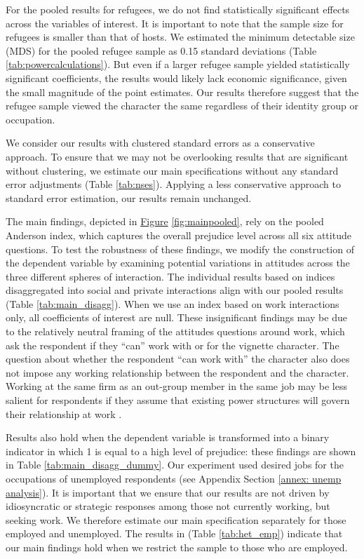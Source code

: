 \documentclass[a4paper,12pt]{article}
\begin{document}
For the pooled results for refugees, we do not find statistically significant effects across the variables of interest. It is important to note that the sample size for refugees is smaller than that of hosts. We estimated the minimum detectable size (MDS) for the pooled refugee sample as 0.15 standard deviations (Table \ref{tab:powercalculations}). But even if a larger refugee sample yielded statistically significant coefficients, the results would likely lack economic significance, given the small magnitude of the point estimates.  Our results therefore suggest that the refugee sample viewed the character the same regardless of their identity group or occupation.

We consider our results with clustered standard errors as a conservative approach. To ensure that we may not be overlooking results that are significant without clustering, we estimate our main specifications without any standard error adjustments (Table \ref{tab:nses}). Applying a less conservative approach to standard error estimation, our results remain unchanged.

The main findings, depicted in \hyperref[fig:mainpooled]{Figure} \ref{fig:mainpooled}, rely on the pooled Anderson index, which captures the overall prejudice level across all six attitude questions. To test the robustness of these findings, we modify the construction of the dependent variable by examining potential variations in attitudes across the three different spheres of interaction. The individual results based on indices disaggregated into social and private interactions align with our pooled results (Table \ref{tab:main_disagg}). When we use an index based on work interactions only, all coefficients of interest are null. These insignificant findings may be due to the relatively neutral framing of the attitudes questions around work, which ask the respondent if they ``can'' work with or for the vignette character. The question about whether the respondent ``can work with'' the character also does not impose any working relationship between the respondent and the character. Working at the same firm as an out-group member in the same job may be less salient for respondents if they assume that existing power structures will govern their relationship at work \citep{allport1954nature}.

Results also hold when the dependent variable is transformed into a binary indicator in which 1 is equal to a high level of prejudice: these findings are shown in Table \ref{tab:main_disagg_dummy}. 
Our experiment used desired jobs for the occupations of unemployed respondents (see Appendix Section \ref{annex: unemp analysis}).  It is important that we ensure that our results are not driven by idiosyncratic or strategic responses among those not currently working, but seeking work.  We therefore estimate our main specification separately for those employed and unemployed. The results in (Table \ref{tab:het_emp}) indicate that our main findings hold when we restrict the sample to those who are employed.  
\end{document}
